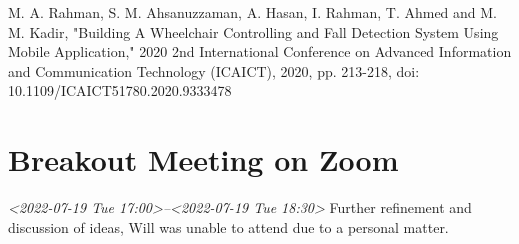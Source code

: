 \documentclass[11pt]{article}
\begin{document}
M. A. Rahman, S. M. Ahsanuzzaman, A. Hasan, I. Rahman, T. Ahmed and M. M. Kadir, "Building A Wheelchair Controlling and Fall Detection System Using Mobile Application," 2020 2nd International Conference on Advanced Information and Communication Technology (ICAICT), 2020, pp. 213-218, doi: 10.1109/ICAICT51780.2020.9333478

\section{Breakout Meeting on Zoom}
\label{sec:org318b56f}
\textit{<2022-07-19 Tue 17:00>--<2022-07-19 Tue 18:30>}
Further refinement and discussion of ideas, Will was unable to attend due to a personal matter.
\end{document}
